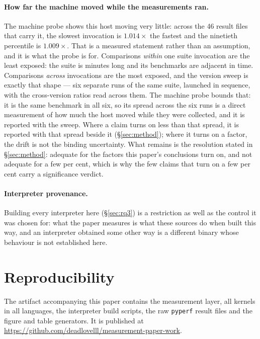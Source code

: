 \documentclass[10pt,a4paper]{article}
\newcommand{\meas}[2]{#2}
\newcommand{\code}[1]{\texttt{\small #1}}
\begin{document}
\paragraph{How far the machine moved while the measurements ran.} The machine probe shows this host
moving very little: across the 46 result files that carry it, the slowest invocation is
$\meas{ratio:b1_compute-pypy311:machine_probe/c_busy|b5_startup-jit:machine_probe/c_busy}{1.014}\times$ the fastest and the ninetieth percentile is $\meas{probeagg:p90}{1.009}\times$. That is a measured
statement rather than an assumption, and it is what the probe is for. Comparisons \emph{within} one suite
invocation are the least exposed: the suite is minutes long and its benchmarks are adjacent in
time. Comparisons \emph{across} invocations are the most exposed, and the version sweep is
exactly that shape --- six separate runs of the same suite, launched in sequence, with the
cross-version ratios read across them. The machine probe bounds that: it is the same benchmark
in all six, so its spread across the six runs is a direct measurement of how much the host
moved while they were collected, and it is reported with the sweep. Where a claim turns on less
than that spread, it is reported with that spread beside it (\S\ref{sec:method}); where it
turns on a factor, the drift is not the binding uncertainty. What remains is the resolution stated in
\S\ref{sec:method}: adequate for the factors this paper's conclusions turn on, and not adequate
for a few per cent, which is why the few claims that turn on a
few per cent carry a significance verdict.

\paragraph{Interpreter provenance.} Building every interpreter here (\S\ref{sec:rq3}) is a
restriction as well as the control it was chosen for: what the paper measures is what these
sources do when built this way, and an interpreter obtained some other way is a different
binary whose behaviour is not established here.

\section{Reproducibility}
\label{sec:repro}

The artifact accompanying this paper contains the measurement layer, all kernels in all
languages, the interpreter build scripts, the raw \code{pyperf} result
files and the figure and table generators. It is published at
\url{https://github.com/deadlovelll/measurement-paper-work}.
\end{document}
